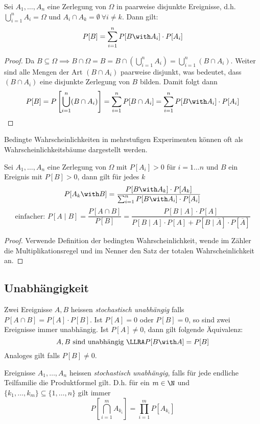 \begin{satz}
Sei $A_1,\dots,A_n$ eine Zerlegung von $\Omega$ in paarweise disjunkte Ereignisse, d.h. $\bigcup_{i=1}^n A_i = \Omega$ und $A_i \cap A_k = \emptyset \: \forall i\neq k$. Dann gilt:
$$ P[B] = \sum_{i=1}^n P[B \with A_i] \cdot P[A_i]$$
\end{satz}
\begin{proof}
Da $B\subseteq \Omega \implies B \cap \Omega = B = B \cap \left( \bigcup_{i=1}^n A_i \right) = \bigcup_{i=1}^n \left(B \cap A_i \right)$. Weiter sind alle Mengen der Art $(B \cap A_i)$ paarweise disjunkt, was bedeutet, dass $(B\cap A_i)$ eine disjunkte Zerlegung von $B$ bilden. Damit folgt dann 
$$ P[B] = P\left[ \bigcup_{i=1}^n (B \cap A_i) \right] = \sum_{i=1}^n P[B \cap A_i] = \sum_{i=1}^n P[B \with A_i] \cdot P[A_i]$$
\end{proof}
Bedingte Wahrscheinlichkeiten in mehrstufigen Experimenten können oft als Wahrscheinlichkeitsbäume dargestellt werden.

\begin{satz}
Sei $A_1,\dots,A_n$ eine Zerlegung von $\Omega$ mit $P[A_i] > 0$ für $i = 1 \dots n$ und $B$ ein Ereignis mit $P[B] > 0$, dann gilt für jedes $k$
$$ P[A_k \with B] = \frac{P[B \with A_k]\cdot P[A_k]}{\sum_{i=1}^n P[B \with A_i] \cdot P[A_i]}$$
\[
	\text{einfacher: } P[A\mid B] =
	\frac{P[A \cap B]}{P[B]} =
	\frac{P[B\mid A]\cdot P[A]}{P[B\mid A]\cdot P[A] + P[B \mid \overline{A}]\cdot P[\overline{A}]}
\]
\end{satz}
\begin{proof}
Verwende Definition der bedingten Wahrscheinlichkeit, wende im Zähler die Multiplikationsregel und im Nenner den Satz der totalen Wahrscheinlichkeit an.
\end{proof}

\subsection{Unabhängigkeit}
\begin{definition}
Zwei Ereignisse $A,B$ heissen \textit{stochastisch unabhängig} falls $P[A \cap B] = P[A] \cdot P[B]$. Ist $P[A]=0$ oder $P[B] = 0$, so sind zwei Ereignisse immer unabhängig. Ist $P[A]\neq 0$, dann gilt folgende Äquivalenz:
$$ A, B \mbox{ sind unabhängig } \LLRA P[B \with A] = P[B]$$
Analoges gilt falls $P[B] \neq 0$.
\end{definition}

\begin{definition}
Ereignisse $A_1,\dots,A_n$ heissen \textit{stochastisch unabhängig}, falls für jede endliche Teilfamilie die Produktformel gilt. D.h. für ein $m \in \N$ und $\{k_1,\dots, k_m\} \subseteq \{1, \dots, n\}$ gilt immer
$$ P \left[ \bigcap_{i=1}^m A_{k_i} \right] = \prod_{i=1}^m P[A_{k_i}]$$
\end{definition}


	





	
	
	
	
